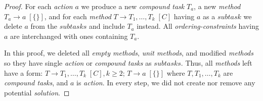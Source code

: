 \begin{proof}
    For each \emph{action} $a$ we produce a new \emph{compound task} $T_a$, a new \emph{method} $T_a \rightarrow a \; [\{\}]$, and for each \emph{method} $T \rightarrow T_1, \dots, T_k \; [C]$ having $a$ as a $subtask$ we delete $a$ from the $subtasks$ and include $T_a$ instead. All \emph{ordering-constraints} having $a$ are interchanged with ones containing $T_a$. 

    In this proof, we deleted all \emph{empty methods}, \emph{unit methods}, and modified \emph{methods} so they have single \emph{action} or \emph{compound tasks} as $subtasks$. Thus, all \emph{methods} left have a form: $T \rightarrow T_1, \dots, T_k \; [C], k \geq 2$; $T \rightarrow a \; [\{\}]$ where $T, T_1, \dots, T_k$ are \emph{compound tasks}, and $a$ is \emph{action}. In every step, we did not create nor remove any potential \emph{solution}.
\end{proof}

